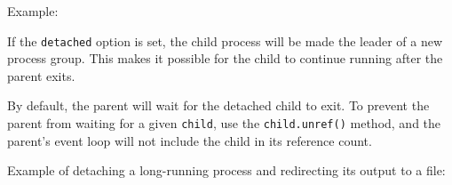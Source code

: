 Example:

\begin{Shaded}
\begin{Highlighting}[]
 \NormalTok{(}\NormalTok{;}

\NormalTok{(}\NormalTok{, [], \{ }\NormalTok{: } \NormalTok{\});}

\NormalTok{(}\NormalTok{, [], \{ }\NormalTok{: [}\NormalTok{, }\NormalTok{, }\NormalTok{] \});}

\NormalTok{(}\NormalTok{, [], \{ }\NormalTok{: [}\NormalTok{, }\NormalTok{, }\NormalTok{, }\NormalTok{, }\NormalTok{] \});}
\end{Highlighting}
\end{Shaded}

If the \texttt{detached} option is set, the child process will be made
the leader of a new process group. This makes it possible for the child
to continue running after the parent exits.

By default, the parent will wait for the detached child to exit. To
prevent the parent from waiting for a given \texttt{child}, use the
\texttt{child.unref()} method, and the parent's event loop will not
include the child in its reference count.

Example of detaching a long-running process and redirecting its output
to a file:

\begin{Shaded}
\begin{Highlighting}[]
  \NormalTok{(}\NormalTok{),}
     \NormalTok{(}\NormalTok{,}
     \NormalTok{(}\NormalTok{, }\NormalTok{),}
     \NormalTok{(}\NormalTok{, }\NormalTok{);}

  \NormalTok{(}\NormalTok{, [], \{}
   \NormalTok{: }\NormalTok{,}
   \NormalTok{: [ }\NormalTok{, out, err ]}
 \NormalTok{\});}

 \NormalTok{();}
\end{Highlighting}
\end{Shaded}

